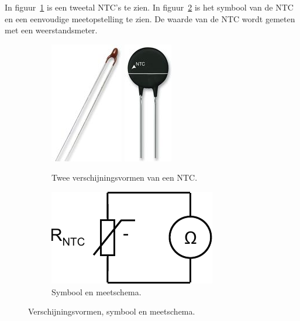 \documentclass[12pt,a4paper,final,twoside,fleqn]{article}
\begin{document}
In figuur~\ref{fig:thermistor1} is een tweetal NTC's te zien.
In figuur~\ref{fig:ntc_symbol_meas} is het symbool van de NTC en een eenvoudige
meetopstelling te zien. De waarde van de NTC wordt gemeten met een weerstandsmeter.

\begin{figure}[ht!]
\begin{subfigure}[c]{0.48\textwidth}
\centering
\includegraphics[scale=0.25]{pics/thermistor1}\hspace*{1cm}
\includegraphics[scale=0.25]{pics/thermistor2}
\caption[Een NTC]{Twee verschijningsvormen van een NTC.}
\label{fig:thermistor1}
\end{subfigure}
\begin{subfigure}[c]{0.48\textwidth}
\centering
\includegraphics[scale=0.63]{drawings/ntc_symbol_meas}
\caption[Een NTC]{Symbool en meetschema.}
\label{fig:ntc_symbol_meas}
\end{subfigure}
\caption{Verschijningsvormen, symbool en meetschema.}
\label{fig:ntcpics}
\end{figure}%
\end{document}
